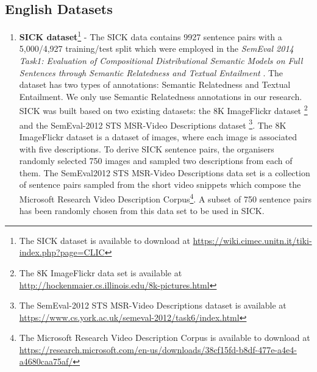 \subsection{English Datasets}
\begin{enumerate}
  \item \textbf{SICK dataset}\footnote{The SICK dataset is available to download at \url{https://wiki.cimec.unitn.it/tiki-index.php?page=CLIC}} - The SICK data contains 9927 sentence pairs with a 5,000/4,927 training/test split which were employed in the \textit{SemEval 2014 Task1: Evaluation of Compositional Distributional Semantic Models on Full Sentences through Semantic Relatedness and Textual Entailment} \autocite{marelli-etal-2014-semeval}. The dataset has two types of annotations: Semantic Relatedness and Textual Entailment. We only use Semantic Relatedness annotations in our research. SICK was built based on two existing datasets: the 8K ImageFlickr dataset \autocite{rashtchian-etal-2010-collecting}\footnote{The 8K ImageFlickr data set is available at \url{http://hockenmaier.cs.illinois.edu/8k-pictures.html}}  and the SemEval-2012 STS MSR-Video Descriptions dataset \autocite{agirre-etal-2012-semeval}\footnote{The SemEval-2012 STS MSR-Video Descriptions dataset is available at \url{https://www.cs.york.ac.uk/semeval-2012/task6/index.html}}. The 8K ImageFlickr dataset is a dataset of images, where each image is associated with five descriptions. To derive SICK sentence pairs, the organisers randomly selected 750 images and sampled two descriptions from each of them. The SemEval2012 STS MSR-Video Descriptions data set is a collection of sentence pairs sampled from the short video snippets which compose the Microsoft Research Video Description Corpus\footnote{The Microsoft Research Video Description Corpus is available to download at \url{https://research.microsoft.com/en-us/downloads/38cf15fd-b8df-477e-a4e4-a4680caa75af/}}. A subset of 750 sentence pairs has been randomly chosen from this data set to be used in SICK. 
  

\end{enumerate}
